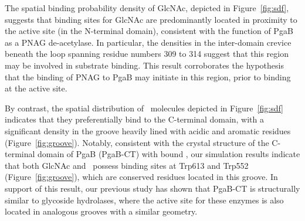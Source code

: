The spatial binding probability density of GlcNAc, depicted in Figure~\ref{fig:sdf}, suggests that binding sites for GlcNAc are predominantly located in proximity to the active site (in the N-terminal domain), consistent with the function of PgaB as a PNAG de-acetylase. In particular, the densities in the inter-domain crevice beneath the loop spanning residue numbers 309 to 314 suggest that this region may be involved in substrate binding.  This result corroborates the hypothesis that the binding of PNAG to PgaB may initiate in this region, prior to binding at the active site.\cite{Little:2012dp} 




By contrast, the spatial distribution of \glucosamine\ molecules depicted in Figure~\ref{fig:sdf} indicates that they preferentially bind to the C-terminal domain, with a significant density in the groove heavily lined with acidic and aromatic residues (Figure~\ref{fig:groove}).
Notably, consistent with the crystal structure of the C-terminal domain of PgaB (PgaB-CT) with bound \glucosamine, our simulation results indicate that both GlcNAc and \glucosamine\ possess binding sites at Trp613 and Trp552  (Figure~\ref{fig:groove}), which are conserved residues located in this groove.\cite{Little:2012dp}
In support of this result, our previous study has shown that PgaB-CT is structurally similar to glycoside hydrolases,\cite{Little:2012dp} where the active site for these enzymes is also located in analogous grooves with a similar geometry. 

